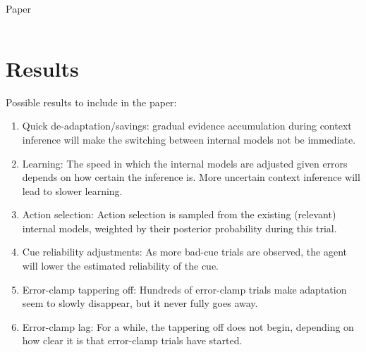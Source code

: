 \documentclass{report}
\begin{document}
\begin{chapter}{Paper}
\begin{tabularx}{\textwidth}{
  l|
  >{\hsize=0.4\hsize\linewidth=\hsize}X|
  >{\hsize=0.2\hsize\linewidth=\hsize}X|
  >{\hsize=0.2\hsize\linewidth=\hsize}X}
\end{tabularx}

\section{Results}
Possible results to include in the paper:
\begin{enumerate}
\item Quick de-adaptation/savings: gradual evidence accumulation during context inference will make the switching between internal models not be immediate.
\item Learning: The speed in which the internal models are adjusted given errors depends on how certain the inference is. More uncertain context inference will lead to slower learning.
\item Action selection: Action selection is sampled from the existing (relevant) internal models, weighted by their posterior probability during this trial.
\item Cue reliability adjustments: As more bad-cue trials are observed, the agent will lower the estimated reliability of the cue.
\item Error-clamp tappering off: Hundreds of error-clamp trials make adaptation seem to slowly disappear, but it never fully goes away.
\item Error-clamp lag: For a while, the tappering off does not begin, depending on how clear it is that error-clamp trials have started.
\end{enumerate}




\end{chapter}

\end{document}
